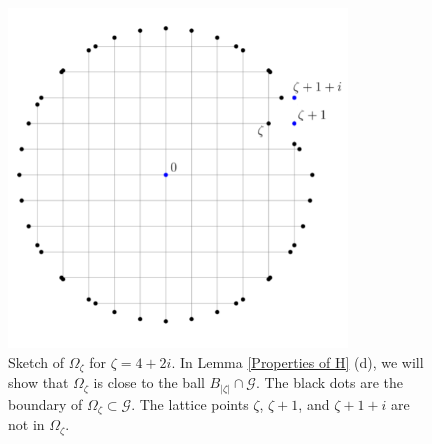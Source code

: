 \documentclass[11pt]{article}
\numberwithin{equation}{section}
\def\OZ{\Omega_{\zeta}}
\begin{document}
\begin{figure}[H]
  \captionsetup{width=.75\linewidth}
  \includegraphics[width=9cm, height=9cm]{Omega_z.png}
  \centering
  \caption{Sketch of $\OZ$ for $\zeta = 4+2i$.  
    In Lemma \ref{Properties of H} (d), we will show that $\OZ$ is 
    close to the ball $B_{|\zeta|} \cap \mathcal{G}$.  
    The black dots are the boundary of $\OZ \subset \mathcal{G}$. 
    The lattice points $\zeta$, $\zeta+1$, and $\zeta+1+i$ are not 
    in $\OZ$.}
  \label{F: Omega_zeta}
\end{figure}
\end{document}
